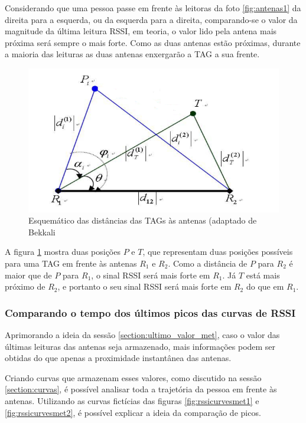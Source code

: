  Considerando que uma pessoa passe em frente às leitoras da foto \ref{fig:antenas1} da direita para a esquerda, ou da esquerda para a direita, comparando-se o valor da magnitude da última leitura RSSI, em teoria, o valor lido pela antena mais próxima será sempre o mais forte. Como as duas antenas estão próximas, durante a maioria das leituras as duas antenas enxergarão a TAG a sua frente.
 
 \begin{figure}[H]
    \centering
    \includegraphics[width=0.8\linewidth]{figs/Metodologia/maisproxima.PNG}
    \caption{Esquemático das distâncias das TAGs às antenas (adaptado de Bekkali \cite{bekkali2007rfid}}
    \label{fig:maisproxima}
\end{figure}
 
  A figura \ref{fig:maisproxima} mostra duas posições $P$ e $T$, que representam duas posições possíveis para uma TAG em frente às antenas $R_1$ e $R_2$. Como a distância de $P$ para $R_2$ é maior que de $P$ para $R_1$, o sinal RSSI será mais forte em $R_1$. Já $T$ está mais próximo de $R_2$, e portanto o seu sinal RSSI será mais forte em $R_2$ do que em $R_1$.

 \subsubsection{Comparando o tempo dos últimos picos das curvas de RSSI} \label{section:picos_met}
 
 Aprimorando a ideia da sessão \ref{section:ultimo_valor_met}, caso o valor das últimas leituras das antenas seja armazenado, mais informações podem ser obtidas do que apenas a proximidade instantânea das antenas.
 
 Criando curvas que armazenam esses valores, como discutido na sessão \ref{section:curvas}, é possível analisar toda a trajetória da pessoa em frente às antenas. Utilizando as curvas fictícias das figuras \ref{fig:rssicurvesmet1} e \ref{fig:rssicurvesmet2}, é possível explicar a ideia da comparação de picos.
 
